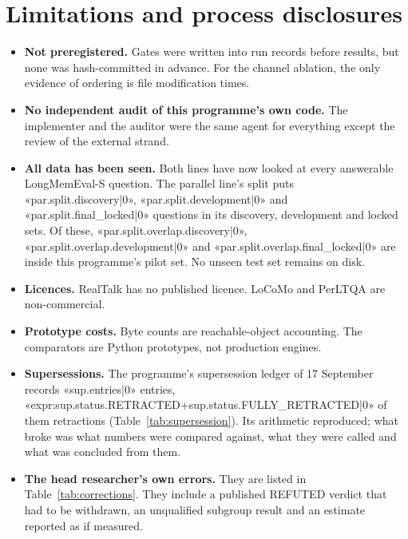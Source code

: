 \documentclass[11pt,a4paper]{article}
\begin{document}
\section{Limitations and process disclosures}\label{sec:limits}
\begin{itemize}\setlength{\itemsep}{1pt}
\item \textbf{Not preregistered.} Gates were written into run records before results, but none was hash-committed in advance. For the channel ablation, the only evidence of ordering is file modification times.
\item \textbf{No independent audit of this programme's own code.} The implementer and the auditor were the same agent for everything except the review of the external strand.
\item \textbf{All data has been seen.} Both lines have now looked at every answerable LongMemEval-S question. The parallel line's split puts «par.split.discovery|0», «par.split.development|0» and «par.split.final_locked|0» questions in its discovery, development and locked sets. Of these, «par.split.overlap.discovery|0», «par.split.overlap.development|0» and «par.split.overlap.final_locked|0» are inside this programme's pilot set. No unseen test set remains on disk.
\item \textbf{Licences.} RealTalk has no published licence. LoCoMo and PerLTQA are non-commercial.
\item \textbf{Prototype costs.} Byte counts are reachable-object accounting. The comparators are Python prototypes, not production engines.
\item \textbf{Supersessions.} The programme's supersession ledger of 17 September records «sup.entries|0» entries, «expr:{sup.status.RETRACTED}+{sup.status.FULLY_RETRACTED}|0» of them retractions (Table~\ref{tab:supersession}). Its arithmetic reproduced; what broke was what numbers were compared against, what they were called and what was concluded from them.
\item \textbf{The head researcher's own errors.} They are listed in Table~\ref{tab:corrections}. They include a published REFUTED verdict that had to be withdrawn, an unqualified subgroup result and an estimate reported as if measured.
\end{itemize}


\end{document}
